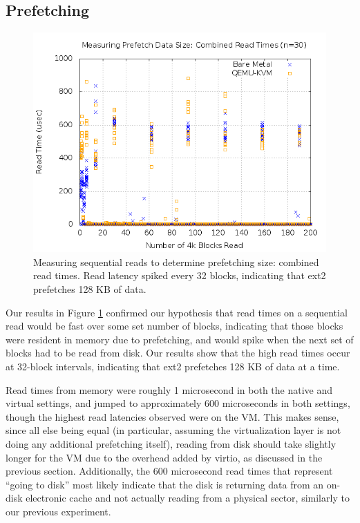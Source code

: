 \documentclass[letterpaper,twocolumn,10pt]{article}
\begin{document}
\subsection{Prefetching}
\begin{figure}[!ht]
\includegraphics[scale=.35]{combined_graphs/prefetch_combined.png}
\caption{Measuring sequential reads to determine prefetching size: combined read times. Read latency spiked every 32 blocks, indicating that ext2 prefetches 128 KB of data.}
\label{fig:prefetch_combined}
\end{figure}
Our results in Figure \ref{fig:prefetch_combined} confirmed our hypothesis that read times on a sequential read would be fast over some set number of blocks, indicating that those blocks were resident in memory due to prefetching, and would spike when the next set of blocks had to be read from disk. 
Our results show that the high read times occur at 32-block intervals, indicating that ext2 prefetches 128 KB of data at a time. 

Read times from memory were roughly 1 microsecond in both the native and virtual settings, and jumped to approximately 600 microseconds in both settings, though the highest read latencies observed were on the VM. 
This makes sense, since all else being equal (in particular, assuming the virtualization layer is not doing any additional prefetching itself), reading from disk should take slightly longer for the VM due to the overhead added by virtio, as discussed in the previous section. Additionally, the 600 microsecond read times that represent ``going to disk'' most likely indicate that the disk is returning data from an on-disk electronic cache and not actually reading from a physical sector, similarly to our previous experiment.
\end{document}

